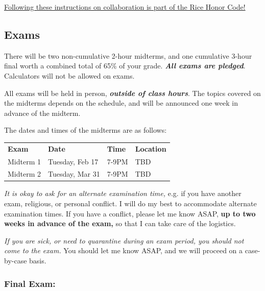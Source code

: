 \documentclass[11pt]{article}
\newcommand{\firstmidtermday}{Tuesday, Feb 17}
\newcommand{\secondmidtermday}{Tuesday, Mar 31}
\newcommand{\examtime}{7-9PM}
\newcommand{\finalday}{\href{https://registrar.rice.edu/students/final-exams}{TBD}}
\begin{document}
\begin{center}
\underline{Following these instructions on collaboration is part of the Rice Honor Code!}
\end{center}


\subsection{Exams}
There will be two non-cumulative 2-hour midterms, and one cumulative 3-hour final worth a combined  total of 65\% of your grade. \emph{\textbf{All exams are pledged}}. Calculators will not be allowed on exams. 

All exams will be held in person, \emph{\textbf{outside of class hours}}.  The topics covered on the midterms depends on the schedule, and will be announced one week in advance of the midterm.

The dates and times of the midterms are as follows:

\begin{center}
\begin{minipage}[t]{.95\textwidth}
\begin{center}
\begin{tabular}{llll}
\textbf{Exam} & \textbf{Date} & \textbf{Time} & \textbf{Location} \\
Midterm 1 & \firstmidtermday & \examtime & TBD\\
Midterm 2 & \secondmidtermday & \examtime & TBD\\
\end{tabular}
\end{center}
\end{minipage}
\end{center}

\emph{It is okay to ask for an alternate examination time,} e.g. if you have another exam, religious, or personal conflict.  I will do my best to accommodate alternate examination times. If you have a conflict, please let me know ASAP, \textbf{up to two weeks in advance of the exam,} so that I can take care of the logistics.

\emph{If you are sick, or need to quarantine during an exam period, you should not come to the exam.}  You should let me know ASAP, and we will proceed on a case-by-case basis.  

\subsubsection*{Final Exam:}
\end{document}
